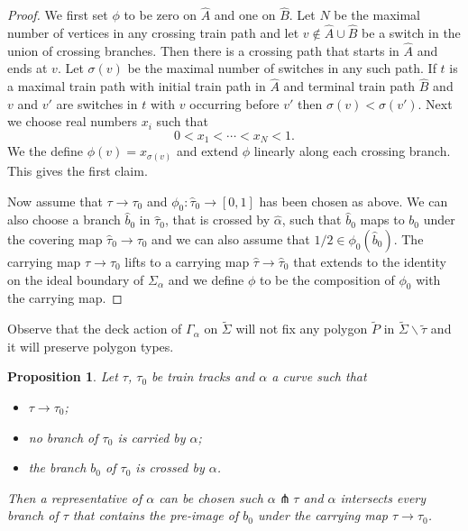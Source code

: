 \documentclass[11pt]{article}
\newtheorem{prop}[thm]{Proposition}
\theoremstyle{remark}
\begin{document}
\begin{proof}
We first set $\phi$ to be zero on $\hat{A}$ and one on $\hat{B}$.
Let $N$ be the maximal number of vertices in any crossing train path and let $v \not\in \hat{A}\cup\hat{B}$ be a switch in the union of crossing branches. Then there is a crossing path that starts in $\hat A$ and ends at $v$. Let $\sigma(v)$ be the maximal number of switches in any such path. If $t$ is a maximal train path with initial train path in $\hat A$ and terminal train path $\hat B$ and $v$ and $v'$ are switches in $t$ with $v$ occurring before $v'$ then $\sigma(v) < \sigma(v')$. 
 Next we choose real numbers $x_i$ such that
$$0< x_1< \cdots < x_N < 1.$$
We the define $\phi(v) = x_{\sigma(v)}$ and extend $\phi$ linearly along each crossing branch. This gives the first claim.

Now assume that $\tau\to \tau_0$ and $\phi_0 \colon \hat\tau_0 \to [0,1]$ has been chosen as above. We can also choose a branch $\hat b_0$ in $\hat\tau_0$, that is crossed by $\hat\alpha$, such that $\hat b_0$ maps to $b_0$ under the covering map $\hat\tau_0 \to \tau_0$ and we can also assume that $1/2 \in \phi_0(\hat b_0)$. The carrying map $\tau\to \tau_0$ lifts to a carrying map $\hat \tau \to \hat \tau_0$ that extends to the identity on the ideal boundary of $\Sigma_\alpha$ and we define $\phi$ to be the composition of $\phi_0$ with the carrying map.
\end{proof}

Observe that the deck action of $\Gamma_\alpha$ on $\tilde\Sigma$ will not fix any polygon $\tilde P$ in $\tilde\Sigma\smallsetminus\tilde\tau$ and it will preserve polygon types.

\begin{prop}\label{transverse curve}
Let $\tau$, $\tau_0$ be train tracks and $\alpha$ a curve such that
\begin{itemize}
\item $\tau\to\tau_0$;
\item no branch of $\tau_0$ is carried by $\alpha$;
\item the branch $b_0$ of $\tau_0$ is crossed by $\alpha$.
\end{itemize}
Then a representative of $\alpha$ can be chosen such $\alpha\pitchfork \tau$ and $\alpha$ intersects every branch of $\tau$ that contains the pre-image of $b_0$ under the carrying map $\tau\to\tau_0$.
\end{prop}
\end{document}
